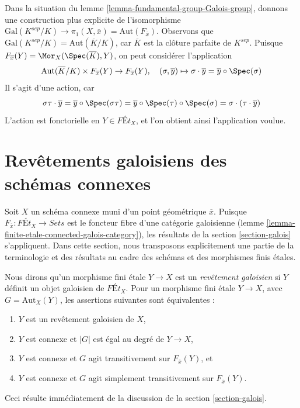 \begin{remark}
\label{remark-variance}
Dans la situation du lemme \ref{lemma-fundamental-group-Galois-group},
donnons une construction plus explicite de l'isomorphisme
$\text{Gal}(K^{sep}/K) \to
\pi_1(X, \overline{x}) = \text{Aut}(F_{\overline{x}})$.
Observons que
$\text{Gal}(K^{sep}/K) = \text{Aut}(\overline{K}/K)$,
car $\overline{K}$ est la clôture parfaite de $K^{sep}$.
Puisque $F_{\overline{x}}(Y) = \Mor_X(\Spec(\overline{K}), Y)$,
on peut considérer l'application
$$
\text{Aut}(\overline{K}/K) \times F_{\overline{x}}(Y) \to F_{\overline{x}}(Y),
\quad
(\sigma, \overline{y}) \mapsto
\sigma \cdot \overline{y} = \overline{y} \circ \Spec(\sigma)
$$
Il s'agit d'une action, car
$$
\sigma\tau \cdot \overline{y} =
\overline{y} \circ \Spec(\sigma\tau) =
\overline{y} \circ \Spec(\tau) \circ \Spec(\sigma) =
\sigma \cdot (\tau \cdot \overline{y})
$$
L'action est fonctorielle en $Y \in \textit{F\'Et}_X$, et l'on
obtient ainsi l'application voulue.
\end{remark}





\section{Revêtements galoisiens des schémas connexes}
\label{section-finite-etale-under-galois}

\noindent
Soit $X$ un schéma connexe muni d'un point géométrique $\overline{x}$.
Puisque $F_{\overline{x}} : \textit{F\'Et}_X \to \textit{Sets}$ est le foncteur fibre d'une
catégorie galoisienne (lemme \ref{lemma-finite-etale-connected-galois-category}),
les résultats de la section \ref{section-galois} s'appliquent.
Dans cette section, nous transposons explicitement une partie de la terminologie
et des résultats au cadre des schémas et des morphismes finis étales.

\medskip\noindent
Nous dirons qu'un morphisme fini étale $Y \to X$ est un
{\it revêtement galoisien} si $Y$ définit un objet galoisien de
$\textit{F\'Et}_X$.
Pour un morphisme fini étale $Y \to X$, avec $G = \text{Aut}_X(Y)$,
les assertions suivantes sont équivalentes :
\begin{enumerate}
\item $Y$ est un revêtement galoisien de $X$,
\item $Y$ est connexe et $|G|$ est égal au degré de $Y \to X$,
\item $Y$ est connexe et $G$ agit transitivement sur $F_{\overline{x}}(Y)$, et
\item $Y$ est connexe et $G$ agit simplement transitivement sur
$F_{\overline{x}}(Y)$.
\end{enumerate}
Ceci résulte immédiatement de la discussion de la section \ref{section-galois}.

